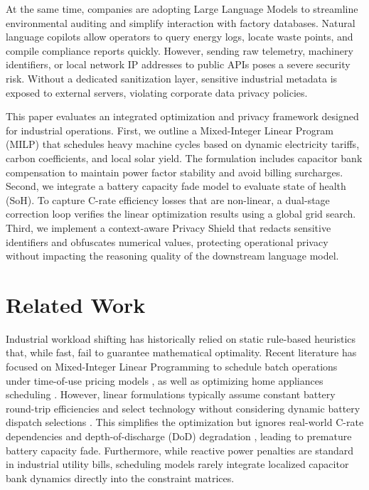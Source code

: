 \documentclass[journal]{IEEEtran}
\begin{document}
At the same time, companies are adopting Large Language Models \cite{ref9} to streamline environmental auditing and simplify interaction with factory databases. Natural language copilots allow operators to query energy logs, locate waste points, and compile compliance reports quickly. However, sending raw telemetry, machinery identifiers, or local network IP addresses to public APIs poses a severe security risk. Without a dedicated sanitization layer, sensitive industrial metadata is exposed to external servers, violating corporate data privacy policies.

This paper evaluates an integrated optimization and privacy framework designed for industrial operations. First, we outline a Mixed-Integer Linear Program (MILP) that schedules heavy machine cycles based on dynamic electricity tariffs, carbon coefficients, and local solar yield. The formulation includes capacitor bank compensation to maintain power factor stability and avoid billing surcharges. Second, we integrate a battery capacity fade model to evaluate state of health (SoH). To capture C-rate efficiency losses that are non-linear, a dual-stage correction loop verifies the linear optimization results using a global grid search. Third, we implement a context-aware Privacy Shield that redacts sensitive identifiers and obfuscates numerical values, protecting operational privacy without impacting the reasoning quality of the downstream language model.

\section{Related Work}
Industrial workload shifting has historically relied on static rule-based heuristics that, while fast, fail to guarantee mathematical optimality. Recent literature has focused on Mixed-Integer Linear Programming to schedule batch operations under time-of-use pricing models \cite{ref1, ref2}, as well as optimizing home appliances scheduling \cite{ref4}. However, linear formulations typically assume constant battery round-trip efficiencies and select technology without considering dynamic battery dispatch selections \cite{ref6}. This simplifies the optimization but ignores real-world C-rate dependencies and depth-of-discharge (DoD) degradation \cite{ref5, ref8}, leading to premature battery capacity fade. Furthermore, while reactive power penalties are standard in industrial utility bills, scheduling models \cite{ref13} rarely integrate localized capacitor bank dynamics directly into the constraint matrices.
\end{document}
